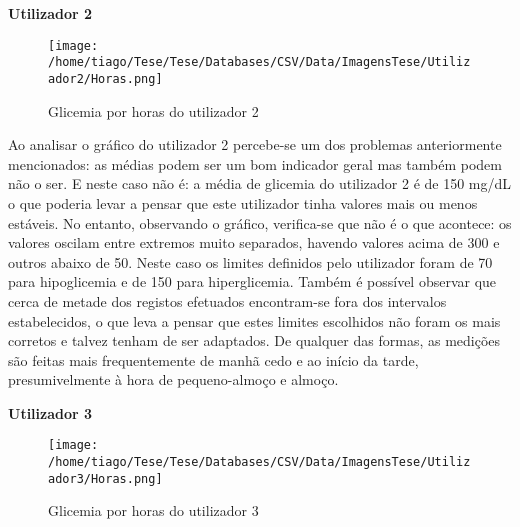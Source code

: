 \textbf{Utilizador 2}

\begin{figure}[H]
\centering
\texttt{[image: /home/tiago/Tese/Tese/Databases/CSV/Data/ImagensTese/Utilizador2/Horas.png]}
\caption{Glicemia por horas do utilizador 2}
\end{figure}

Ao analisar o gráfico do utilizador 2 percebe-se um dos problemas anteriormente mencionados: as médias podem ser um bom indicador geral mas também podem não o ser. E neste caso não é: a média de glicemia do utilizador 2 é de 150 mg/dL o que poderia levar a pensar que este utilizador tinha valores mais ou menos estáveis. No entanto, observando o gráfico, verifica-se que não é o que acontece: os valores oscilam entre extremos muito separados, havendo valores acima de 300 e outros abaixo de 50. Neste caso os limites definidos pelo utilizador foram de 70 para hipoglicemia e de 150 para hiperglicemia. Também é possível observar que cerca de metade dos registos efetuados encontram-se fora dos intervalos estabelecidos, o que leva a pensar que estes limites escolhidos não foram os mais corretos e talvez tenham de ser adaptados. De qualquer das formas, as medições são feitas mais frequentemente de manhã cedo e ao início da tarde, presumivelmente à hora de pequeno-almoço e almoço. 


\textbf{Utilizador 3}

\begin{figure}[H]
\centering
\texttt{[image: /home/tiago/Tese/Tese/Databases/CSV/Data/ImagensTese/Utilizador3/Horas.png]}
\caption{Glicemia por horas do utilizador 3}
\end{figure}

